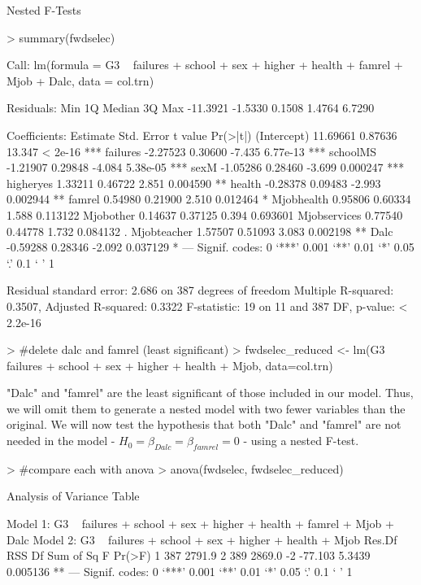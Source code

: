 \documentclass{article}
\begin{document}
Nested F-Tests
\begin{Schunk}
\begin{Sinput}
> summary(fwdselec)
\end{Sinput}
\begin{Soutput}
Call:
lm(formula = G3 ~ failures + school + sex + higher + health + 
    famrel + Mjob + Dalc, data = col.trn)

Residuals:
     Min       1Q   Median       3Q      Max 
-11.3921  -1.5330   0.1508   1.4764   6.7290 

Coefficients:
             Estimate Std. Error t value Pr(>|t|)    
(Intercept)  11.69661    0.87636  13.347  < 2e-16 ***
failures     -2.27523    0.30600  -7.435 6.77e-13 ***
schoolMS     -1.21907    0.29848  -4.084 5.38e-05 ***
sexM         -1.05286    0.28460  -3.699 0.000247 ***
higheryes     1.33211    0.46722   2.851 0.004590 ** 
health       -0.28378    0.09483  -2.993 0.002944 ** 
famrel        0.54980    0.21900   2.510 0.012464 *  
Mjobhealth    0.95806    0.60334   1.588 0.113122    
Mjobother     0.14637    0.37125   0.394 0.693601    
Mjobservices  0.77540    0.44778   1.732 0.084132 .  
Mjobteacher   1.57507    0.51093   3.083 0.002198 ** 
Dalc         -0.59288    0.28346  -2.092 0.037129 *  
---
Signif. codes:  0 ‘***’ 0.001 ‘**’ 0.01 ‘*’ 0.05 ‘.’ 0.1 ‘ ’ 1

Residual standard error: 2.686 on 387 degrees of freedom
Multiple R-squared:  0.3507,	Adjusted R-squared:  0.3322 
F-statistic:    19 on 11 and 387 DF,  p-value: < 2.2e-16
\end{Soutput}
\begin{Sinput}
> #delete dalc and famrel (least significant)
> fwdselec_reduced <- lm(G3 ~ failures + school + sex + higher + health + Mjob, data=col.trn)
\end{Sinput}
\end{Schunk}

"Dalc" and "famrel" are the least significant of those included in our model. Thus, we will omit them to generate a nested model with two fewer variables than the original. We will now test the hypothesis that both "Dalc" and "famrel" are not needed in the model - $H_{0}=\beta_{Dalc}=\beta_{famrel}=0$ - using a nested F-test. 

\begin{Schunk}
\begin{Sinput}
> #compare each with anova
> anova(fwdselec, fwdselec_reduced)
\end{Sinput}
\begin{Soutput}
Analysis of Variance Table

Model 1: G3 ~ failures + school + sex + higher + health + famrel + Mjob + 
    Dalc
Model 2: G3 ~ failures + school + sex + higher + health + Mjob
  Res.Df    RSS Df Sum of Sq      F   Pr(>F)   
1    387 2791.9                                
2    389 2869.0 -2   -77.103 5.3439 0.005136 **
---
Signif. codes:  0 ‘***’ 0.001 ‘**’ 0.01 ‘*’ 0.05 ‘.’ 0.1 ‘ ’ 1
\end{Soutput}
\end{Schunk}
\end{document}
